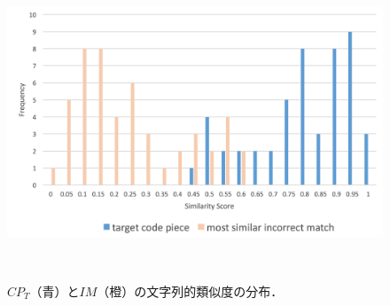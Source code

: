 





\begin{figure}[t]
\centering
  \includegraphics[width=1.0\columnwidth]{algorithm/histogram_sim.png}
  \caption{$CP_T$（青）と$IM$（橙）の文字列的類似度の分布．}~\label{fig:histogram_sim}
\end{figure}









